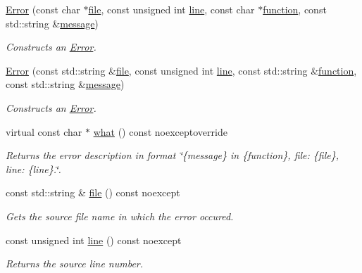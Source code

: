 \begin{DoxyCompactItemize}
\hyperlink{group___utility_module_gab98e5ffafca5efc6945f295698550854}{Error} (const char $\ast$\hyperlink{group___utility_module_ga0b75e32780cb8534179ff3c060739496}{file}, const unsigned int \hyperlink{group___utility_module_ga13437b5caffe754b7a32fc3c514907e5}{line}, const char $\ast$\hyperlink{group___utility_module_gaa69c98222c56544a9094154a8eab4db9}{function}, const std\+::string \&\hyperlink{group___utility_module_ga7269ba8049ed86338733955565242539}{message})
\begin{DoxyCompactList}\small\item\em Constructs an \hyperlink{classdg_1_1deepcore_1_1_error}{Error}. \end{DoxyCompactList}\item 
\hyperlink{group___utility_module_ga0e8a3ee91298ab22afb0d7146afa23fb}{Error} (const std\+::string \&\hyperlink{group___utility_module_ga0b75e32780cb8534179ff3c060739496}{file}, const unsigned int \hyperlink{group___utility_module_ga13437b5caffe754b7a32fc3c514907e5}{line}, const std\+::string \&\hyperlink{group___utility_module_gaa69c98222c56544a9094154a8eab4db9}{function}, const std\+::string \&\hyperlink{group___utility_module_ga7269ba8049ed86338733955565242539}{message})
\begin{DoxyCompactList}\small\item\em Constructs an \hyperlink{classdg_1_1deepcore_1_1_error}{Error}. \end{DoxyCompactList}\item 
virtual const char $\ast$ \hyperlink{group___utility_module_ga7dff6b319144bcfcf602e0124fb0fb01}{what} () const noexceptoverride
\begin{DoxyCompactList}\small\item\em Returns the error description in format \char`\"{}\{message\} in \{function\}, file\+: \{file\}, line\+: \{line\}.\char`\"{}. \end{DoxyCompactList}\item 
const std\+::string \& \hyperlink{group___utility_module_ga0b75e32780cb8534179ff3c060739496}{file} () const noexcept
\begin{DoxyCompactList}\small\item\em Gets the source file name in which the error occured. \end{DoxyCompactList}\item 
const unsigned int \hyperlink{group___utility_module_ga13437b5caffe754b7a32fc3c514907e5}{line} () const noexcept
\begin{DoxyCompactList}\small\item\em Returns the source line number. \end{DoxyCompactList}\item 

\end{DoxyCompactItemize}
